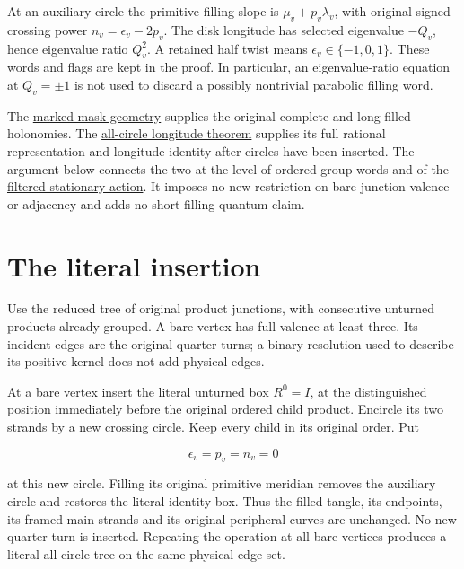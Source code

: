 At an auxiliary circle the primitive filling slope is
\(\mu_v+p_v\lambda_v\), with original signed crossing power
\(n_v=\epsilon_v-2p_v\). The disk longitude has selected
eigenvalue \(-Q_v\), hence eigenvalue ratio \(Q_v^2\).
A retained half twist means \(\epsilon_v\in\{-1,0,1\}\).
These words and flags are kept in the proof. In particular,
an eigenvalue-ratio equation at \(Q_v=\pm1\) is not used to
discard a possibly nontrivial parabolic filling word.

The \href{https://sashakolpakov.github.io/murakamis_dream/notes/actual_conway_general_mask_marked_filling.html}{marked mask geometry}
supplies the original complete and long-filled holonomies.
The \href{https://sashakolpakov.github.io/murakamis_dream/notes/actual_all_circle_geometric_characteristic.html}{all-circle longitude theorem}
supplies its full rational representation and longitude identity
after circles have been inserted. The argument below connects
the two at the level of ordered group words and of the
\href{https://sashakolpakov.github.io/murakamis_dream/notes/actual_main_meridian_filtered_characteristic.html}{filtered stationary action}.
It imposes no new restriction on bare-junction valence or adjacency
and adds no short-filling quantum claim.

\section{The literal insertion}\label{gj:the-literal-insertion}

Use the reduced tree of original product junctions, with consecutive unturned products already grouped. A bare vertex has full valence at least three. Its incident edges are the original quarter-turns; a binary resolution used to describe its positive kernel does not add physical edges.

At a bare vertex insert the literal unturned box \(R^0=I\), at the distinguished position immediately before the original ordered child product. Encircle its two strands by a new crossing circle. Keep every child in its original order. Put

\begin{equation}\label{gj:1}
\epsilon_v=p_v=n_v=0
\end{equation}

at this new circle. Filling its original primitive meridian removes the auxiliary circle and restores the literal identity box. Thus the filled tangle, its endpoints, its framed main strands and its original peripheral curves are unchanged. No new quarter-turn is inserted. Repeating the operation at all bare vertices produces a literal all-circle tree on the same physical edge set.

